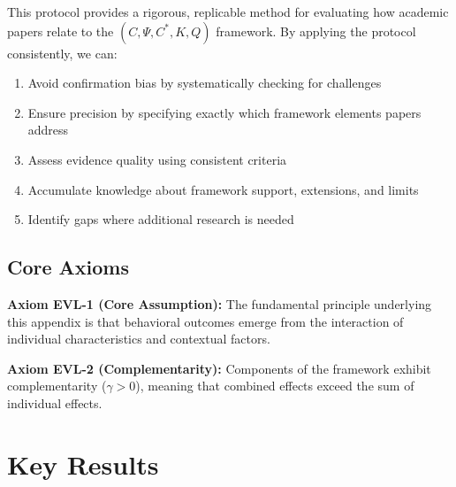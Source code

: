 This protocol provides a rigorous, replicable method for evaluating how academic papers
relate to the $(C, \Psi, C^*, K, Q)$ framework. By applying the protocol consistently, we can:
\begin{enumerate}
  \item Avoid confirmation bias by systematically checking for challenges
  \item Ensure precision by specifying exactly which framework elements papers address
  \item Assess evidence quality using consistent criteria
  \item Accumulate knowledge about framework support, extensions, and limits
  \item Identify gaps where additional research is needed
\end{enumerate}


\subsection{Core Axioms}
\label{sec:evl-axioms}

\begin{tcolorbox}[colback=yellow!5!white,colframe=yellow!75!black,title=Axiom EVL-1: Fundamental Principle]
\textbf{Axiom EVL-1 (Core Assumption):}
The fundamental principle underlying this appendix is that behavioral outcomes
emerge from the interaction of individual characteristics and contextual factors.
\end{tcolorbox}

\begin{tcolorbox}[colback=yellow!5!white,colframe=yellow!75!black,title=Axiom EVL-2: Complementarity]
\textbf{Axiom EVL-2 (Complementarity):}
Components of the framework exhibit complementarity ($\gamma > 0$), meaning
that combined effects exceed the sum of individual effects.
\end{tcolorbox}



\section{Key Results}
\label{sec:evl-results}

